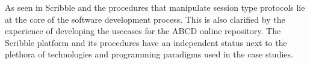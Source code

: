 %

As seen in  Scribble and the procedures
that manipulate session type protocols lie at the core
of the software development process. This is also clarified
by the experience of developing the usecases for the ABCD
online repository. The Scribble platform and its procedures
have an independent status next to the plethora of technologies and
programming paradigms used in the case studies.

%


%

